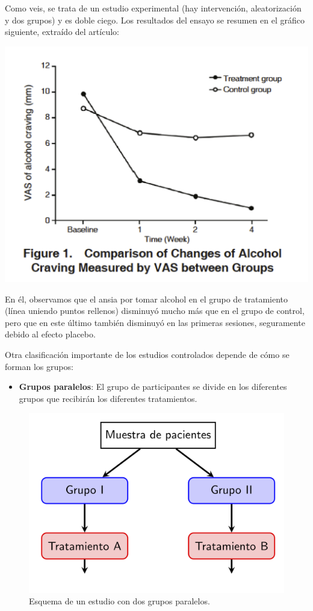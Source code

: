 \documentclass[
]{book}
\providecommand{\tightlist}{%
  \setlength{\itemsep}{0pt}\setlength{\parskip}{0pt}}
\theoremstyle{definition}
\theoremstyle{definition}
\theoremstyle{definition}
\theoremstyle{definition}
\theoremstyle{remark}
\begin{document}
Como veis, se trata de un estudio experimental (hay intervención, aleatorización y dos grupos) y es doble ciego. Los resultados del ensayo se resumen en el gráfico siguiente, extraído del artículo:

\begin{center}\includegraphics[width=0.6\linewidth]{INREMDN_files/figure-html/acupuntura2} \end{center}

En él, observamos que el ansia por tomar alcohol en el grupo de tratamiento (línea uniendo puntos rellenos) disminuyó mucho más que en el grupo de control, pero que en este último también disminuyó en las primeras sesiones, seguramente debido al efecto placebo.

Otra clasificación importante de los estudios controlados depende de cómo se forman los grupos:

\begin{itemize}
\tightlist
\item
  \textbf{Grupos paralelos}: El grupo de participantes se divide en los diferentes grupos que recibirán los diferentes tratamientos.
\end{itemize}

\begin{figure}

{\centering \includegraphics[width=0.5\linewidth]{INREMDN_files/figure-html/EsquemaGP} 

}

\caption{Esquema de un estudio con dos grupos paralelos.}\label{fig:paralelos}
\end{figure}
\end{document}
